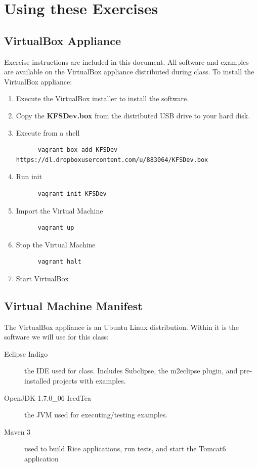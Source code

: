 \documentclass[letterpaper,notitlepage,12pt]{book}
\begin{document}
\section*{Using these Exercises}
\subsection*{VirtualBox Appliance}
Exercise instructions are included in this document. All software and
examples are available on the VirtualBox appliance distributed during
class. To install the VirtualBox appliance:
\begin{enumerate}
  \item Execute the VirtualBox installer to install the software.
  \item Copy the \textbf{KFSDev.box} from the distributed USB drive to
    your hard disk.
  \item Execute from a shell 
    \begin{verbatim}
      vagrant box add KFSDev https://dl.dropboxusercontent.com/u/883064/KFSDev.box
    \end{verbatim}
  \item Run init
    \begin{verbatim}
      vagrant init KFSDev
    \end{verbatim}
  \item Import the Virtual Machine
    \begin{verbatim}
      vagrant up
    \end{verbatim}
  \item Stop the Virtual Machine
    \begin{verbatim}
      vagrant halt
    \end{verbatim}
  \item Start VirtualBox
\end{enumerate}

\subsection*{Virtual Machine Manifest}
The VirtualBox appliance is an Ubuntu Linux distribution. Within it is
the software we will use for this class:
\begin{description}
  \item [Eclipse Indigo] the IDE used for class. Includes Subclipse,
    the m2eclipse plugin, and pre-installed projects with examples.
  \item [OpenJDK 1.7.0\_06 IcedTea] the JVM used for executing/testing
    examples.
  \item [Maven 3] used to build Rice applications, run tests, and
    start the Tomcat6 application
\end{description}
\end{document}
